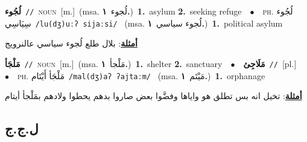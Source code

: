 \documentclass[10pt,a4paper,twoside]{article} %
\begin{document}
\begin{multicols}{2}
{\setlength\topsep{0pt}\textbf{\foreignlanguage{arabic}{لُجُوء}}\ {\color{gray}\texttt{//}\color{black}}\ \textsc{noun}\ [m.]\ \color{gray}(msa. \foreignlanguage{arabic}{لُجوء}~\foreignlanguage{arabic}{\textbf{١.}})\color{black}\ \textbf{1.}~asylum  \textbf{2.}~seeking refuge\ \ $\bullet$\ \ \textsc{ph.} \color{gray} \foreignlanguage{arabic}{لُجُوء سِيَاسِي}\color{black}\ {\color{gray}\texttt{/{\sffamily lu(dʒ)uːʔ sijaːsi}/}\color{black}}\ \color{gray} (msa. \foreignlanguage{arabic}{لُجوء سياسي}~\foreignlanguage{arabic}{\textbf{١.}})\color{black}\ \textbf{1.}~political asylum\  \begin{flushright}\color{gray}\foreignlanguage{arabic}{\textbf{\underline{\foreignlanguage{arabic}{أمثلة}}}: بلال طلع لُجوء سياسي عالنرويج}\end{flushright}\color{black}} \vspace{2mm}

{\setlength\topsep{0pt}\textbf{\foreignlanguage{arabic}{مَلْجَأ}}\ {\color{gray}\texttt{//}\color{black}}\ \textsc{noun}\ [m.]\ \color{gray}(msa. \foreignlanguage{arabic}{مَلْجأ}~\foreignlanguage{arabic}{\textbf{١.}})\color{black}\ \textbf{1.}~shelter  \textbf{2.}~sanctuary\ \ $\bullet$\ \ \setlength\topsep{0pt}\textbf{\foreignlanguage{arabic}{مَلَاجِئ}}\ {\color{gray}\texttt{//}\color{black}}\ [pl.]\ \ $\bullet$\ \ \textsc{ph.} \color{gray} \foreignlanguage{arabic}{مَلْجَأ أَيْتَام}\color{black}\ {\color{gray}\texttt{/{\sffamily mal(dʒ)aʔ ʔajtaːm}/}\color{black}}\ \color{gray} (msa. \foreignlanguage{arabic}{مَيْتَم}~\foreignlanguage{arabic}{\textbf{١.}})\color{black}\ \textbf{1.}~orphanage\  \begin{flushright}\color{gray}\foreignlanguage{arabic}{\textbf{\underline{\foreignlanguage{arabic}{أمثلة}}}: تخيل انه بس تطلق هو واياها وفضَّوا بعض صاروا بدهم يحطوا ولادهم بمَلْجأ أيتام}\end{flushright}\color{black}} \vspace{2mm}

\vspace{-3mm}
\subsection*{\color{blue}\foreignlanguage{arabic}{ل.ج.ج}\color{blue}{}} 


\end{multicols}
\end{document}
